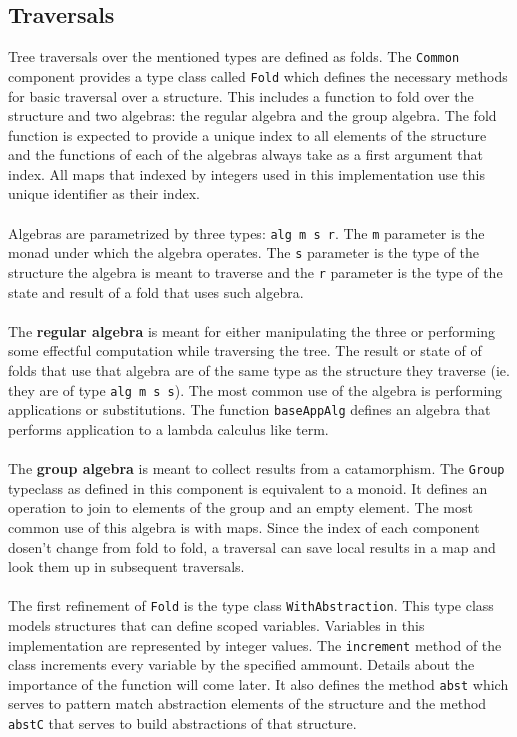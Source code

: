 \documentclass[8pt]{extarticle}
\begin{document}
\subsection{Traversals}
Tree traversals over the mentioned types are defined as folds. The \verb+Common+ component provides a type class called \verb+Fold+ which defines the necessary methods for basic traversal over a structure. This includes a function to fold over the structure and two algebras: the regular algebra and the group algebra. The fold function is expected to provide a unique index to all elements of the structure and the functions of each of the algebras always take as a first argument that index. All maps that indexed by integers used in this implementation use this unique identifier as their index.
\\\\
Algebras are parametrized by three types: \verb+alg m s r+. The \verb+m+ parameter is the monad under which the algebra operates. The \verb+s+ parameter is the type of the structure the algebra is meant to traverse and the \verb+r+ parameter is the type of the state and result of a fold that uses such algebra.
\\\\
The {\bf regular algebra} is meant for either manipulating the three or performing some effectful computation while traversing the tree. The result or state of of folds that use that algebra are of the same type as the structure they traverse (ie. they are of type \verb+alg m s s+). The most common use of the algebra is performing applications or substitutions. The function \verb+baseAppAlg+ defines an algebra that performs application to a lambda calculus like term.
\\\\
The {\bf group algebra} is meant to collect results from a catamorphism. The \verb+Group+ typeclass as defined in this component is equivalent to a monoid. It defines an operation to join to elements of the group and an empty element. The most common use of this algebra is with maps. Since the index of each component dosen't change from fold to fold, a traversal can save local results in a map and look them up in subsequent traversals.
\\\\
The first refinement of \verb+Fold+ is the type class \verb+WithAbstraction+. This type class models structures that can define scoped variables. Variables in this implementation are represented by integer values. The \verb+increment+ method of the class increments every variable by the specified ammount. Details about the importance of the function will come later. It also defines the method \verb+abst+ which serves to pattern match abstraction elements of the structure and the method \verb+abstC+ that serves to build abstractions of that structure.
\end{document}
